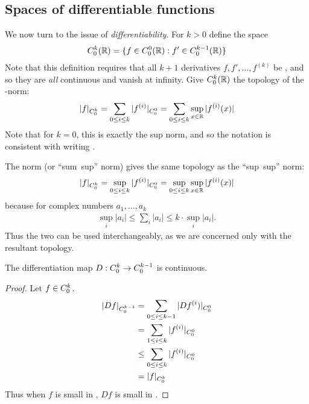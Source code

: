     \subsection{Spaces of differentiable functions}
      We now turn to the issue of \emph{differentiability}.
      For $k>0$ define the space 
      \begin{align*}
        {C^k_0}(\mathbb{R}) = \{f\in {C^0_0}(\mathbb{R}) : f'\in {C^{k-1}_0}(\mathbb{R})\}
      \end{align*}
      Note that this definition requires that all $k+1$ derivatives $f,f',\ldots,f^{(k)}$ be \Coo, and so they are \emph{all} continuous and vanish at infinity.
      Give ${C^k_0}(\mathbb{R})$ the topology of the \Cko-norm:
      \begin{align*}
        |f|_{C^k_0} = \sum_{0\le i\le k} |f^{(i)}|_{C^0_0} = \sum_{0\le i\le k} \sup_{x\in\mathbb{R}}|f^{(i)}(x)|
      \end{align*}
      Note that for $k=0$, this is exactly the sup norm, and so the notation \Cko is consistent with writing \Coo.
      \begin{rmk}
        The \Cko norm (or ``sum~sup'' norm) gives the same topology as the ``sup~sup'' norm:
        \begin{align*}
          |f|_{C^k_0}=\sup_{0\le i\le k}|f^{(i)}|_{C^0_0}=\sup_{0\le i\le k}\sup_{x\in\mathbb{R}}|f^{(i)}(x)|
        \end{align*}
        because for complex numbers $a_1,\ldots,a_k$
        \begin{align*}
          \sup_i |a_i| \le \sum_i |a_i| \le k\cdot\sup_i |a_i|\text{.}
        \end{align*}
        Thus the two can be used interchangeably, as we are concerned only with the resultant topology.
      \end{rmk}
      \begin{claim}
        \label{claim:diffcontCk0}
        The differentiation map $D:{C^k_0}\rightarrow{C^{k-1}_0}$ is continuous.
        \begin{proof}
          Let $f\in {C^k_0}$.
          \begin{align*}
            |Df|_{C^{k-1}_0}
            &= \sum_{0\le i\le k-1} |Df^{(i})|_{C^0_0}
            \\&= \sum_{1\le i\le k} |f^{(i)}|_{C^0_0}
            \\&\le \sum_{0\le i\le k} |f^{(i)}|_{C^0_0}
            \\&= |f|_{C^k_0}
          \end{align*}
          Thus when $f$ is small in \Cko, $Df$ is small in \Ckmo.
        \end{proof}
      \end{claim}
